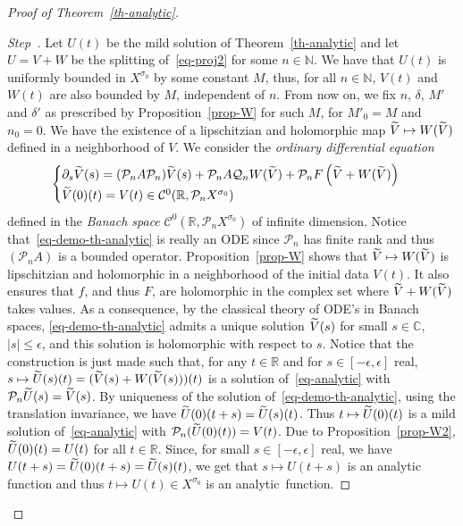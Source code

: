 \documentclass[10pt]{amsart}
\theoremstyle{definition}\newtheorem{defi}[theo]{Definition}\newtheorem{rema}[theo]{Remark}\newtheorem{exam}[theo]{Example}\newtheorem{exem}[theo]{Example}\newtheorem{nota}[theo]{Notation}
\newcommand{\RR}{\mathbb{R}}
\newcommand{\NN}{\mathbb{N}}
\newcommand{\CC}{\mathbb{C}}
\newcommand{\Cc}{\mathcal{C}}
\newcommand{\Pc}{\mathcal{P}}
\newcommand{\Qc}{\mathcal{Q}}
\newcounter{stepcount}
\newenvironment{step}{\refstepcounter{stepcount}\begin{proof}[Step~\thestepcount]}{\let\qed\relax\end{proof}}
\let\oldtilde\tilde
\renewcommand*{\tilde}[1]{\mathchoice{\widetilde{#1}}{\widetilde{#1}}{\oldtilde{#1}}{\oldtilde{#1}}}\let\oldexists\exists
\renewcommand*{\exists}{\mathrel{\oldexists}}
\begin{document}
\begin{proof}[{Proof of Theorem~\ref{th-analytic}}]
\begin{step}
Let $U(t)$ be the mild solution of Theorem~\ref{th-analytic} and let $U=V+W$ be the splitting of~\eqref{eq-proj2} for some $n\in\NN$. We have that $U(t)$ is uniformly bounded in $X^{\sigma_0}$ by some constant $M$, thus, for all $n\in\NN$, $V(t)$ and $W(t)$ are also bounded by $M$, independent of $n$. From now on, we fix $n$, $\delta$, $M'$ and $\delta'$ as prescribed by Proposition~\ref{prop-W} for such $M$, for $M'_0=M$ and $n_0=0$. We have the existence of a lipschitzian and holomorphic map $\tilde V\mapsto W(\tilde V)$ defined in a neighborhood of $V$. We consider the \emph{ordinary differential equation}
\begin{equation}\label{eq-demo-th-analytic}
\begin{cases}
\partial_s \tilde V(s)=(\Pc_n A \Pc_n) \tilde V(s) + \Pc_n A\Qc_n W(\tilde V) +
\Pc_n F\left(\tilde V+W(\tilde V)\right)\\
\tilde V(0)(t)=V(t) \in\Cc^0(\RR,\Pc_n X^{\sigma_0})
\end{cases}
\end{equation}
defined in the \emph{Banach space} $\Cc^0(\RR,\Pc_n X^{\sigma_0})$ of infinite dimension. Notice that~\eqref{eq-demo-th-analytic} is really an ODE since $\Pc_n$ has finite rank and thus $(\Pc_n A)$ is a bounded operator. Proposition~\ref{prop-W} shows that $\tilde V\mapsto W(\tilde V)$ is lipschitzian and holomorphic in a neighborhood of the initial data $V(t)$. It also ensures that $f$, and thus $F$, are holomorphic in the complex set where $\tilde V+W(\tilde V)$ takes values. As a consequence, by the classical theory of ODE's in Banach spaces, \eqref{eq-demo-th-analytic} admits a unique solution $\tilde V(s)$ for small $s\in \CC$, $|s|\leq \epsilon$, and this solution is holomorphic with respect to $s$. Notice that the construction is just made such that, for any $t\in\RR$ and for $s\in[-\epsilon,\epsilon]$ real, $s\mapsto\tilde U(s)(t)=(\tilde V(s)+W(\tilde V(s)))(t)$ is a solution of~\eqref{eq-analytic} with $\Pc_n \tilde U(s)=\tilde V(s)$. By uniqueness of the solution of~\eqref{eq-demo-th-analytic}, using the translation invariance, we have $\tilde U(0)(t+s)=\tilde U(s)(t)$. Thus $t\mapsto\tilde U(0)(t)$ is a mild solution of~\eqref{eq-analytic} with $\Pc_n (\tilde U(0)(t))=V(t)$. Due to Proposition~\ref{prop-W2}, $\tilde U(0)(t)=U(t)$ for all $t\in\RR$. Since, for small $s\in[-\epsilon,\epsilon]$ real, we have $U(t+s)=\tilde U(0)(t+s)=\tilde U(s)(t)$, we get that $s\mapsto U(t+s)$ is an analytic function and thus $t\mapsto U(t)\in X^{\sigma_0}$ is an analytic~function.\qedhere 
\end{step}\let\qed\relax
\end{proof}
\end{document}
